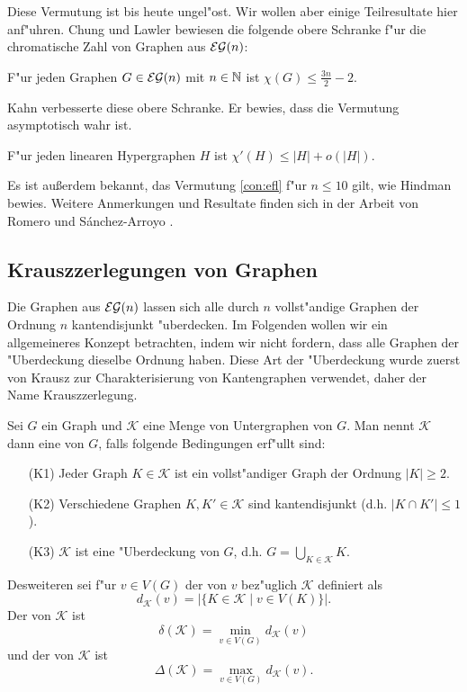 Diese Vermutung ist bis heute ungel"ost. Wir wollen aber einige Teilresultate hier anf"uhren. Chung und Lawler \cite{ChungL88} bewiesen die folgende obere Schranke f"ur die chromatische Zahl von Graphen aus ${\cal EG}(n)$:

\begin{theorem}
  F"ur jeden Graphen $G\in{\cal EG}(n)$ mit $n\in{\mathbb{N}}$ ist $\chi(G) \leq \frac{3n}{2}-2$.
  \label{thm:ChungLawler}
\end{theorem}

Kahn \cite{Kahn92} verbesserte diese obere Schranke. Er bewies, dass die Vermutung asymptotisch wahr ist.
\begin{theorem}
  F"ur jeden linearen Hypergraphen $H$ ist $\chi'(H) \leq |H| + o(|H|)$.
  \label{thm:kahn}
\end{theorem}

Es ist au{\ss}erdem bekannt, das Vermutung \ref{con:efl} f"ur $n\leq 10$ gilt, wie Hindman \cite{Hindman81} bewies.
Weitere Anmerkungen und Resultate finden sich in der Arbeit von Romero und S\'anchez-Arroyo \cite{RomeroS2007}.

\subsection{Krauszzerlegungen von Graphen}
Die Graphen aus ${\cal EG}(n)$ lassen sich alle durch $n$ vollst"andige Graphen der Ordnung $n$ kantendisjunkt "uberdecken. Im Folgenden wollen wir ein allgemeineres Konzept betrachten, indem wir nicht fordern, dass alle Graphen der "Uberdeckung dieselbe Ordnung haben. 
Diese Art der "Uberdeckung wurde zuerst von Krausz \cite{Krausz43} zur Charakterisierung von Kantengraphen verwendet, daher der Name Krauszzerlegung. 

Sei $G$ ein Graph und $\mathcal{K}$ eine Menge von Untergraphen von $G$. Man nennt $\mathcal{K}$ dann eine  von $G$, falls folgende Bedingungen erf"ullt sind:
\begin{enumerate}
  \item[\rm{(K1)}] Jeder Graph $K\in \mathcal{K}$ ist ein vollst"andiger Graph der Ordnung $|K| \geq 2$. 
  \item[\rm{(K2)}] Verschiedene Graphen $K,K'\in \mathcal{K}$ sind kantendisjunkt (d.h. $|K\cap K'| \leq 1$).
  \item[\rm{(K3)}] $\mathcal K$ ist eine "Uberdeckung von $G$, d.h.  $G=\bigcup\limits_{K\in \mathcal K}K$.
\end{enumerate}
Desweiteren sei f"ur $v\in V(G)$ der  von $v$ bez"uglich $\mathcal K$ definiert als $$d_{\mathcal{K}}(v) = |\{ K\in\mathcal K \;|\;  v \in V(K)\}|.$$ Der  von $\mathcal K$ ist $$\delta(\mathcal K) = \min\limits_{v\in V(G)}d_{\mathcal{K}}(v)$$ und der  von $\mathcal{K}$ ist $$\Delta(\mathcal{K}) = \max\limits_{v\in V(G)}d_{\mathcal{K}}(v).$$

